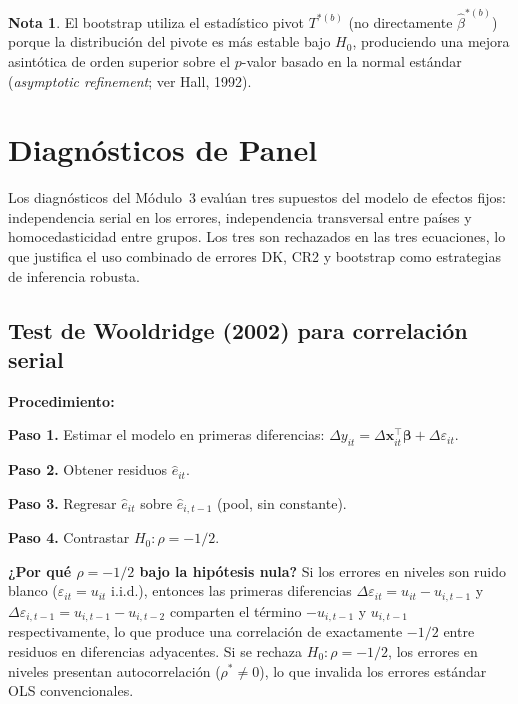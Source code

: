 \documentclass[12pt, a4paper]{article}
\theoremstyle{definition}
\newtheorem{remark}{Nota}[section]
\begin{document}
\begin{remark}
El bootstrap utiliza el estadístico pivot $T^{*(b)}$ (no directamente $\hat\beta^{*(b)}$) porque la distribución del pivote es más estable bajo $H_0$, produciendo una mejora asintótica de orden superior sobre el $p$-valor basado en la normal estándar (\textit{asymptotic refinement}; ver Hall, 1992).
\end{remark}

\section{Diagnósticos de Panel}

Los diagnósticos del Módulo~3 evalúan tres supuestos del modelo de efectos fijos: independencia serial en los errores, independencia transversal entre países y homocedasticidad entre grupos. Los tres son rechazados en las tres ecuaciones, lo que justifica el uso combinado de errores DK, CR2 y bootstrap como estrategias de inferencia robusta.

\subsection{Test de Wooldridge (2002) para correlación serial}

\textbf{Procedimiento:}

\textbf{Paso 1.} Estimar el modelo en primeras diferencias: $\Delta y_{it} = \Delta\bm{x}_{it}^\top\bm{\beta} + \Delta\varepsilon_{it}$.

\textbf{Paso 2.} Obtener residuos $\hat{e}_{it}$.

\textbf{Paso 3.} Regresar $\hat{e}_{it}$ sobre $\hat{e}_{i,t-1}$ (pool, sin constante).

\textbf{Paso 4.} Contrastar $H_0: \rho = -1/2$.

\begin{intuitionbox}
\textbf{¿Por qué $\rho = -1/2$ bajo la hipótesis nula?} Si los errores en niveles son ruido blanco ($\varepsilon_{it} = u_{it}$ i.i.d.), entonces las primeras diferencias $\Delta\varepsilon_{it} = u_{it} - u_{i,t-1}$ y $\Delta\varepsilon_{i,t-1} = u_{i,t-1} - u_{i,t-2}$ comparten el término $-u_{i,t-1}$ y $u_{i,t-1}$ respectivamente, lo que produce una correlación de exactamente $-1/2$ entre residuos en diferencias adyacentes. Si se rechaza $H_0: \rho = -1/2$, los errores en niveles presentan autocorrelación ($\rho^* \neq 0$), lo que invalida los errores estándar OLS convencionales.
\end{intuitionbox}
\end{document}
